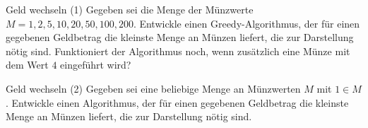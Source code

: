 \begin{frame}{Geld wechseln (1)}
	Gegeben sei die Menge der Münzwerte $M = {1, 2, 5, 10, 20, 50, 100, 200}$.
	Entwickle einen Greedy-Algorithmus, der für einen gegebenen Geldbetrag die kleinste Menge an Münzen liefert, die zur Darstellung nötig sind.
	Funktioniert der Algorithmus noch, wenn zusätzlich eine Münze mit dem Wert $4$ eingeführt wird?
\end{frame}

\begin{frame}{Geld wechseln (2)}
	Gegeben sei eine beliebige Menge an Münzwerten $M$ mit $1 \in M$.
	Entwickle einen Algorithmus, der für einen gegebenen Geldbetrag die kleinste Menge an Münzen liefert, die zur Darstellung nötig sind.
\end{frame}



